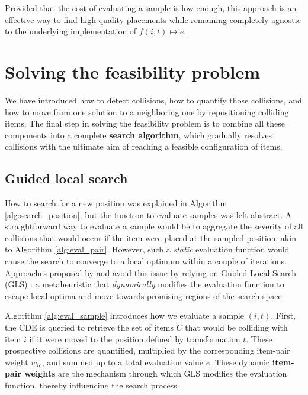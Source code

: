 \documentclass[preprint, 11pt, authoryear]{elsarticle}
\begin{document}
Provided that the cost of evaluating a sample is low enough, this approach is an effective way to find high-quality placements while remaining completely agnostic to the underlying implementation of $f(i,t) \mapsto e$.

\section{Solving the feasibility problem} \label{section:solve_feas}
We have introduced how to detect collisions, how to quantify those collisions, and how to move from one solution to a neighboring one by repositioning colliding items.
The final step in solving the feasibility problem is to combine all these components into a complete \textbf{search algorithm}, which gradually resolves collisions with the ultimate aim of reaching a feasible configuration of items.

\subsection{Guided local search} \label{section:guided_local_search}
How to search for a new position was explained in Algorithm \ref{alg:search_position}, but the function to evaluate samples was left abstract.
A straightforward way to evaluate a sample would be to aggregate the severity of all collisions that would occur if the item were placed at the sampled position, akin to Algorithm \ref{alg:eval_pair}.
However, such a \emph{static} evaluation function would cause the search to converge to a local optimum within a couple of iterations.
Approaches proposed by \citet{umetani2009solving} and \citet{sato2019raster} avoid this issue by relying on Guided Local Search (GLS) \citep{voudouris2010guided}:
a metaheuristic that \emph{dynamically} modifies the evaluation function to escape local optima and move towards promising regions of the search space.



Algorithm \ref{alg:eval_sample} introduces how we evaluate a sample $(i, t)$.
First, the CDE is queried to retrieve the set of items $C$ that would be colliding with item $i$ if it were moved to the position defined by transformation $t$.
These prospective collisions are quantified, multiplied by the corresponding item-pair weight $w_{ic}$, and summed up to a total evaluation value $e$.
These dynamic \textbf{item-pair weights} are the mechanism through which GLS modifies the evaluation function, thereby influencing the search process.
\end{document}
